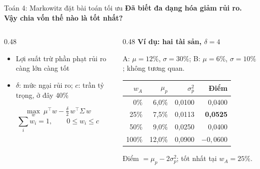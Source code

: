 \documentclass[aspectratio=169,10pt]{beamer}
\let\small\normalsize
\newcommand{\lead}[1]{{\color{structure}\bfseries #1}\par\vspace{5pt}}
\begin{document}
\begin{frame}[t]{Toán 4: Markowitz đặt bài toán tối ưu}
  \lead{Đã biết đa dạng hóa giảm rủi ro. Vậy chia vốn thế nào là tốt nhất?}
  \begin{columns}[T]
    \begin{column}{0.48\textwidth}
      \begin{itemize}
        \item Lợi suất trừ phần phạt rủi ro càng lớn càng tốt \cite{markowitz}
        \item \(\delta\): mức ngại rủi ro; \(c\): trần tỷ trọng, ở đây 40\%
      \end{itemize}
      \[ \max_{w}\ \mu^{\top}w-\tfrac{\delta}{2}\,w^{\top}\Sigma\,w \]
      \[ \textstyle\sum_i w_i=1,\qquad 0\le w_i\le c \]
    \end{column}
    \begin{column}{0.48\textwidth}
      \textbf{Ví dụ: hai tài sản, \(\delta=4\)}

      {\small A: \(\mu=12\%\), \(\sigma=30\%\); B: \(\mu=6\%\), \(\sigma=10\%\); không tương quan.}
      \vspace{2pt}

      \begin{tabular}{@{}rrrr@{}}
        \toprule
        \(w_A\) & \(\mu_p\) & \(\sigma_p^2\) & Điểm \\
        \midrule
        0\% & 6,0\% & 0,0100 & 0,0400 \\
        25\% & 7,5\% & 0,0113 & \textbf{0,0525} \\
        50\% & 9,0\% & 0,0250 & 0,0400 \\
        100\% & 12,0\% & 0,0900 & \(-0{,}0600\) \\
        \bottomrule
      \end{tabular}

      \vspace{2pt}
      {\small Điểm \(=\mu_p-2\sigma_p^2\); tốt nhất tại \(w_A=25\%\).}
    \end{column}
  \end{columns}
\end{frame}
\end{document}
